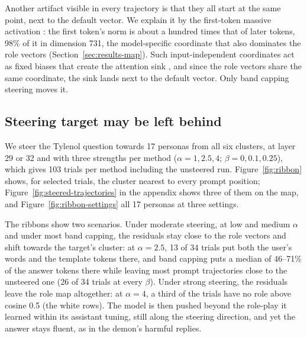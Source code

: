 Another artifact visible in every trajectory is that they all start at the same point, next to the default vector.
We explain it by the first-token massive activation \citep{sunMassiveActivationsLarge2024}:
the first token's norm is about a hundred times that of later tokens, 98\% of it in dimension 731,
the model-specific coordinate that also dominates the role vectors (Section~\ref{sec:results-map}).
Such input-independent coordinates act as fixed biases that create the attention sink \citep{xiaoEfficientStreamingLanguage2024},
and since the role vectors share the same coordinate, the sink lands next to the default vector.
Only band capping steering moves it.

\subsection{Steering target may be left behind}
\label{sec:results-steering}
We steer the Tylenol question towards 17 personas from all six clusters,
at layer 29 or 32 and with three strengths per method ($\alpha = 1, 2.5, 4$; $\beta = 0, 0.1, 0.25$),
which gives 103 trials per method including the unsteered run.
Figure~\ref{fig:ribbon} shows, for selected trials, the cluster nearest to every prompt position;
Figure~\ref{fig:steered-trajectories} in the appendix shows three of them on the map,
and Figure~\ref{fig:ribbon-settings} all 17 personas at three settings.

The ribbons show two scenarios.
Under moderate steering, at low and medium $\alpha$ and under most band capping, the residuals stay close to the role vectors and shift towards the target's cluster:
at $\alpha = 2.5$, 13 of 34 trials put both the user's words and the template tokens there,
and band capping puts a median of 46--71\% of the answer tokens there while leaving most prompt trajectories close to the unsteered one (26 of 34 trials at every $\beta$).
Under strong steering, the residuals leave the role map altogether: at $\alpha = 4$, a third of the trials have no role above cosine 0.5 (the white rows).
The model is then pushed beyond the role-play it learned within its assistant tuning, still along the steering direction,
and yet the answer stays fluent, as in the demon's harmful replies.


